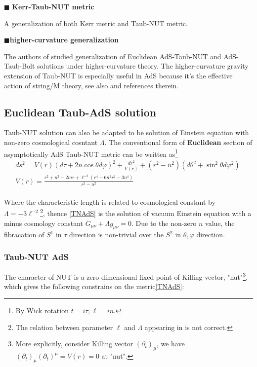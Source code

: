 \documentclass[12pt, a4paper]{article}
\numberwithin{equation}{section}
\newcommand{\be}{\begin{equation}}
\newcommand{\ee}{\end{equation}}
\begin{document}
$\blacksquare$ \textbf{Kerr-Taub-NUT metric}

A generalization of both Kerr metric and Taub-NUT metric. \cite{Miller:1973km}

$\blacksquare$\textbf{higher-curvature generalization}

The authors of \cite{Bueno:2018bl} studied generalization of Euclidean AdS-Taub-NUT and AdS-Taub-Bolt solutions under higher-curvature theory. The higher-curvature gravity extension of Taub-NUT is especially useful in AdS because it's the effective action of string/M theory, see also\cite{Khodam:2009eg} and references therein.

\subsection{Euclidean Taub-AdS solution}
Taub-NUT solution can also be adapted to be solution of Einstein equation with non-zero cosmological cosntant $\Lambda$. The conventional form of \textbf{Euclidean} section of asymptotically AdS Taub-NUT metric can be written as\cite{Chamblin:1998ah}\cite{Emparan:1999ac}\footnote{By Wick rotation $t = i\tau, \ell = in$.}
\be
\begin{aligned}
	&ds^2 = V(r)(d\tau +2n\cos\theta d\varphi)^2 +\frac{dr^2}{V(r)} + (r^2-n^2)(d\theta^2+\sin^2\theta d\varphi^2)&\\
	& V(r) = \frac{r^2+n^2-2mr+\ell^{-2}(r^4-6n^2r^2-3n^4)}{r^2 - n^2}&\\
\end{aligned}\
\label{TNAdS}
\ee

Where the characteristic length is related to cosmological constant by $\Lambda = -3\ell^{-2}$\footnote{The relation between parameter $\ell$ and $\Lambda$ appearing in \cite{Chamblin:1998ah}\cite{Bobev:2016sh} is not correct.}, thence \ref{TNAdS} is the solution of vacuum Einstein equation with a minus cosmology constant $G_{\mu\nu}+\Lambda g_{\mu\nu} = 0$. Due to the non-zero $n$ value, the fibracation of $S^1$ in $\tau$ direction is non-trivial over the $S^2$ in $\theta,\varphi$ direction.

\subsubsection{Taub-NUT AdS}

The character of NUT is a zero dimensional fixed point of Killing vector, "nut"\footnote{More explicitly, consider Killing vector $(\partial_t)_\mu$, we have $(\partial_t)_\mu(\partial_t)^\mu = V(r)=0$ at "nut".}, which gives the following constrains on the metric\ref{TNAdS}:
\end{document}
